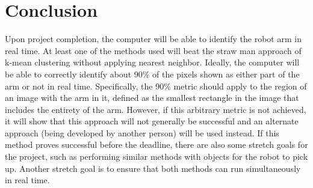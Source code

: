 \documentclass[10pt,journal,compsoc, draftclsnofoot,onecolumn]{IEEEtran}
\begin{document}
\section{Conclusion}
Upon project completion, the computer will be able to identify the robot arm in real time.
At least one of the methods used will beat the straw man approach of k-mean clustering without applying nearest neighbor.
Ideally, the computer will be able to correctly identify about 90\% of the pixels shown as either part of the arm or not in real time.%
Specifically, the 90\% metric should apply to the region of an image with the arm in it, defined as the smallest rectangle in the image that includes the entirety of the arm.
However, if this arbitrary metric is not achieved, it will show that this approach will not generally be successful and an alternate approach (being developed by another person) will be used instead.
If this method proves successful before the deadline, there are also some stretch goals for the project, such as performing similar methods with objects for the robot to pick up.
Another stretch goal is to ensure that both methods can run simultaneously in real time.

\newpage
\nocite{*}%


\end{document}
